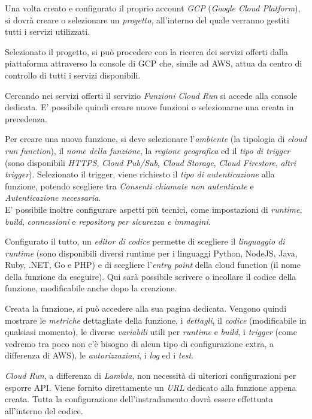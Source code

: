 Una volta creato e configurato il proprio account \textit{GCP} (\textit{Google Cloud Platform}), si dovrà creare o selezionare un \textit{progetto}, all'interno del quale verranno gestiti tutti i servizi utilizzati.

Selezionato il progetto, si può procedere con la ricerca dei servizi offerti dalla piattaforma attraverso la console di GCP che, simile ad AWS, attua da centro di controllo di tutti i servizi disponibili.

Cercando nei servizi offerti il servizio \textit{Funzioni Cloud Run} si accede alla console dedicata. E' possibile quindi creare nuove funzioni o selezionarne una creata in precedenza.

Per creare una nuova funzione, si deve selezionare l'\textit{ambiente} (la tipologia di \textit{cloud run function}), il \textit{nome della funzione}, la \textit{regione geografica} ed il \textit{tipo di trigger} (sono disponibili \textit{HTTPS}, \textit{Cloud Pub/Sub}, \textit{Cloud Storage}, \textit{Cloud Firestore}, \textit{altri trigger}). Selezionato il trigger, viene richiesto il \textit{tipo di autenticazione} alla funzione, potendo scegliere tra \textit{Consenti chiamate non autenticate} e \textit{Autenticazione necessaria}.\\
E' possibile inoltre configurare aspetti più tecnici, come impostazioni di \textit{runtime}, \textit{build}, \textit{connessioni} e \textit{repository per sicurezza e immagini}.

Configurato il tutto, un \textit{editor di codice} permette di scegliere il \textit{linguaggio di runtime} (sono disponibili diversi runtime per i linguaggi Python, NodeJS, Java, Ruby, .NET, Go e PHP) e di scegliere l'\textit{entry point} della cloud function (il nome della funzione da eseguire). Qui sarà possibile scrivere o incollare il codice della funzione, modificabile anche dopo la creazione.

Creata la funzione, si può accedere alla sua pagina dedicata. Vengono quindi mostrare le \textit{metriche} dettagliate della funzione, i \textit{dettagli}, il \textit{codice} (modificabile in qualsiasi momento), le diverse \textit{variabili} utili per \textit{runtime} e \textit{build}, i \textit{trigger} (come vedremo tra poco non c'è bisogno di alcun tipo di configurazione extra, a differenza di AWS), le \textit{autorizzazioni}, i \textit{log} ed i \textit{test}. 

\textit{Cloud Run}, a differenza di \textit{Lambda}, non necessità di ulteriori configurazioni per esporre API. Viene fornito direttamente un \textit{URL} dedicato alla funzione appena creata. Tutta la configurazione dell'instradamento dovrà essere effettuata all'interno del codice.
